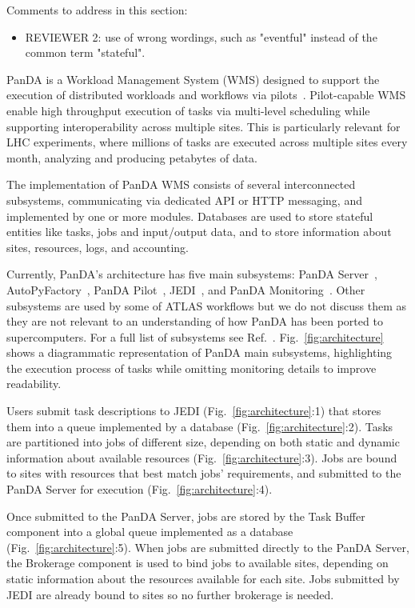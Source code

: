 \ifreview
Comments to address in this section:
\begin{itemize}
	\color{red} 
	\item REVIEWER 2: use of wrong wordings, such as "eventful" instead of
	the common term "stateful".
\end{itemize}
\fi

PanDA is a Workload Management System (WMS) %
designed to support the execution of distributed workloads and workflows via
pilots~\cite{turilli2017comprehensive}. Pilot-capable WMS enable high
throughput execution of tasks via multi-level scheduling while supporting
interoperability across multiple sites. This is particularly relevant for LHC
experiments, where millions of tasks are executed across multiple sites every
month, analyzing and producing petabytes of data. 

The implementation of PanDA WMS consists of several interconnected
subsystems, communicating via dedicated API or HTTP messaging, and
implemented by one or more modules. Databases are used to store stateful
entities like tasks, jobs and input/output data, and to store information
about sites, resources, logs, and accounting.

Currently, PanDA's architecture has five main subsystems: PanDA
Server~\cite{maeno2011overview},
AutoPyFactory~\cite{caballero2012autopyfactory}, PanDA
Pilot~\cite{nilsson2011atlas}, JEDI~\cite{borodin2015scaling}, and PanDA
Monitoring~\cite{klimentov2011atlas}. Other subsystems are used by some of
ATLAS workflows but we do not discuss them as they are not relevant to an
understanding of how PanDA has been ported to supercomputers. For a full list
of subsystems see Ref.~\cite{panda-wiki_url}. Fig.~\ref{fig:architecture}
shows a diagrammatic representation of PanDA main subsystems, highlighting
the execution process of tasks while omitting monitoring details to improve
readability.

Users submit task descriptions to JEDI (Fig.~\ref{fig:architecture}:1) that
stores them into a queue implemented by a database
(Fig.~\ref{fig:architecture}:2). Tasks are partitioned into jobs of different
size, depending on both static and dynamic information about available
resources (Fig.~\ref{fig:architecture}:3). Jobs are bound to sites with
resources that best match jobs' requirements, and submitted to the PanDA
Server for execution (Fig.~\ref{fig:architecture}:4).

Once submitted to the PanDA Server, jobs are stored by the Task Buffer
component into a global queue implemented as a database
(Fig.~\ref{fig:architecture}:5). When jobs are submitted directly to the
PanDA Server, the Brokerage component is used to bind jobs to available
sites, depending on static information about the resources available for each
site. Jobs submitted by JEDI are already bound to sites so no further
brokerage is needed.

